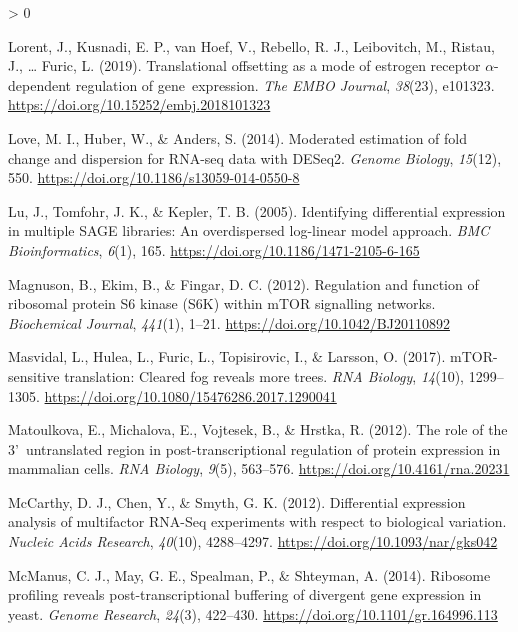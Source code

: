 \documentclass[
  12pt,
  openany]{book}
\newlength{\cslhangindent}
\newenvironment{CSLReferences}[2] %
 {%
  \setlength{\parindent}{0pt}
  \ifodd #1 \everypar{\setlength{\hangindent}{\cslhangindent}}\ignorespaces\fi
  \ifnum #2 > 0
  \setlength{\parskip}{#2\baselineskip}
  \fi
 }%
 {}
\begin{document}
\begin{CSLReferences}{1}{0}
\leavevmode\hypertarget{ref-Lorent2019}{}%
Lorent, J., Kusnadi, E. P., van Hoef, V., Rebello, R. J., Leibovitch, M., Ristau, J., \ldots{} Furic, L. (2019). Translational offsetting as a mode of estrogen receptor {\(\alpha\)}-dependent regulation of gene~expression. \emph{The EMBO Journal}, \emph{38}(23), e101323. \url{https://doi.org/10.15252/embj.2018101323}

\leavevmode\hypertarget{ref-Love2014}{}%
Love, M. I., Huber, W., \& Anders, S. (2014). Moderated estimation of fold change and dispersion for {RNA}-seq data with {DESeq2}. \emph{Genome Biology}, \emph{15}(12), 550. \url{https://doi.org/10.1186/s13059-014-0550-8}

\leavevmode\hypertarget{ref-Lu2005}{}%
Lu, J., Tomfohr, J. K., \& Kepler, T. B. (2005). Identifying differential expression in multiple {SAGE} libraries: An overdispersed log-linear model approach. \emph{BMC Bioinformatics}, \emph{6}(1), 165. \url{https://doi.org/10.1186/1471-2105-6-165}

\leavevmode\hypertarget{ref-Magnuson2012}{}%
Magnuson, B., Ekim, B., \& Fingar, D. C. (2012). Regulation and function of ribosomal protein {S6} kinase ({S6K}) within {mTOR} signalling networks. \emph{Biochemical Journal}, \emph{441}(1), 1--21. \url{https://doi.org/10.1042/BJ20110892}

\leavevmode\hypertarget{ref-Masvidal2017}{}%
Masvidal, L., Hulea, L., Furic, L., Topisirovic, I., \& Larsson, O. (2017). {mTOR}-sensitive translation: {Cleared} fog reveals more trees. \emph{RNA Biology}, \emph{14}(10), 1299--1305. \url{https://doi.org/10.1080/15476286.2017.1290041}

\leavevmode\hypertarget{ref-Matoulkova2012}{}%
Matoulkova, E., Michalova, E., Vojtesek, B., \& Hrstka, R. (2012). The role of the 3'~untranslated region in post-transcriptional regulation of protein expression in mammalian cells. \emph{RNA Biology}, \emph{9}(5), 563--576. \url{https://doi.org/10.4161/rna.20231}

\leavevmode\hypertarget{ref-McCarthy2012}{}%
McCarthy, D. J., Chen, Y., \& Smyth, G. K. (2012). Differential expression analysis of multifactor {RNA}-{Seq} experiments with respect to biological variation. \emph{Nucleic Acids Research}, \emph{40}(10), 4288--4297. \url{https://doi.org/10.1093/nar/gks042}

\leavevmode\hypertarget{ref-McManus2014}{}%
McManus, C. J., May, G. E., Spealman, P., \& Shteyman, A. (2014). Ribosome profiling reveals post-transcriptional buffering of divergent gene expression in yeast. \emph{Genome Research}, \emph{24}(3), 422--430. \url{https://doi.org/10.1101/gr.164996.113}


\end{CSLReferences}
\end{document}
